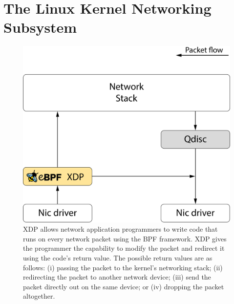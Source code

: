 \documentclass[sigconf, nonacm]{acmart}
\begin{document}
%


\section{The Linux Kernel Networking Subsystem}

\begin{figure}
  \includegraphics[width=0.6\linewidth]{network-overview.pdf}
  \caption{XDP allows network application programmers to write code that runs on every network packet using the BPF framework. XDP gives the programmer the capability to modify the packet and redirect it using the code's return value. The possible return values are as follows: (i) passing the packet to the kernel's networking stack; (ii) redirecting the packet to another network device; (iii) send the packet directly out on the same device; or (iv) dropping the packet altogether.}
  \label{fig:network_overview}
\end{figure}
\end{document}
